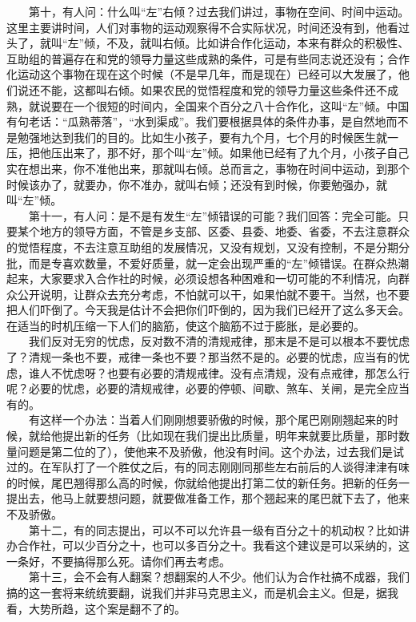 \documentclass[cn,11pt,chinese]{elegantbook}
\begin{document}
　　第十，有人问：什么叫“左”右倾？过去我们讲过，事物在空间、时间中运动。这里主要讲时间，人们对事物的运动观察得不合实际状况，时间还没有到，他看过头了，就叫“左”倾，不及，就叫右倾。比如讲合作化运动，本来有群众的积极性、互助组的普遍存在和党的领导力量这些成熟的条件，可是有些同志说还没有；合作化运动这个事物在现在这个时候（不是早几年，而是现在）已经可以大发展了，他们说还不能，这都叫右倾。如果农民的觉悟程度和党的领导力量这些条件还不成熟，就说要在一个很短的时间内，全国来个百分之八十合作化，这叫“左”倾。中国有句老话：“瓜熟蒂落”，“水到渠成”。我们要根据具体的条件办事，是自然地而不是勉强地达到我们的目的。比如生小孩子，要有九个月，七个月的时候医生就一压，把他压出来了，那不好，那个叫“左”倾。如果他已经有了九个月，小孩子自己实在想出来，你不准他出来，那就叫右倾。总而言之，事物在时间中运动，到那个时候该办了，就要办，你不准办，就叫右倾；还没有到时候，你要勉强办，就叫“左”倾。\\
　　第十一，有人问：是不是有发生“左”倾错误的可能？我们回答：完全可能。只要某个地方的领导方面，不管是乡支部、区委、县委、地委、省委，不去注意群众的觉悟程度，不去注意互助组的发展情况，又没有规划，又没有控制，不是分期分批，而是专喜欢数量，不爱好质量，就一定会出现严重的“左”倾错误。在群众热潮起来，大家要求入合作社的时候，必须设想各种困难和一切可能的不利情况，向群众公开说明，让群众去充分考虑，不怕就可以干，如果怕就不要干。当然，也不要把人们吓倒了。今天我是估计不会把你们吓倒的，因为我们已经开了这么多天会。在适当的时机压缩一下人们的脑筋，使这个脑筋不过于膨胀，是必要的。\\
　　我们反对无穷的忧虑，反对数不清的清规戒律，那末是不是可以根本不要忧虑了？清规一条也不要，戒律一条也不要？那当然不是的。必要的忧虑，应当有的忧虑，谁人不忧虑呀？也要有必要的清规戒律。没有点清规，没有点戒律，那怎么行呢？必要的忧虑，必要的清规戒律，必要的停顿、间歇、煞车、关闸，是完全应当有的。\\
　　有这样一个办法：当着人们刚刚想要骄傲的时候，那个尾巴刚刚翘起来的时候，就给他提出新的任务（比如现在我们提出比质量，明年来就要比质量，那时数量问题是第二位的了），使他来不及骄傲，他没有时间。这个办法，过去我们是试过的。在军队打了一个胜仗之后，有的同志刚刚同那些左右前后的人谈得津津有味的时候，尾巴翘得那么高的时候，你就给他提出打第二仗的新任务。把新的任务一提出去，他马上就要想问题，就要做准备工作，那个翘起来的尾巴就下去了，他来不及骄傲。\\
　　第十二，有的同志提出，可以不可以允许县一级有百分之十的机动权？比如讲办合作社，可以少百分之十，也可以多百分之十。我看这个建议是可以采纳的，这一条好，不要搞得那么死。请你们再去考虑。\\
　　第十三，会不会有人翻案？想翻案的人不少。他们认为合作社搞不成器，我们搞的这一套将来统统要翻，说我们并非马克思主义，而是机会主义。但是，据我看，大势所趋，这个案是翻不了的。\\
\end{document}
